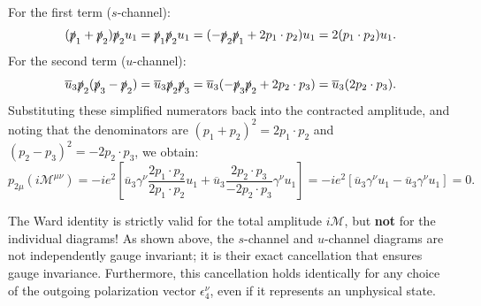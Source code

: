 For the first term ($s$-channel):
\[
    (\slashed{p}_1 + \slashed{p}_2) \slashed{p}_2 u_1 = \slashed{p}_1 \slashed{p}_2 u_1 = (-\slashed{p}_2 \slashed{p}_1 + 2p_1 \cdot p_2) u_1 = 2(p_1 \cdot p_2) u_1.
\]
For the second term ($u$-channel):
\[
    \overline{u}_3 \slashed{p}_2 (\slashed{p}_3 - \slashed{p}_2) = \overline{u}_3 \slashed{p}_2 \slashed{p}_3 = \overline{u}_3 (-\slashed{p}_3 \slashed{p}_2 + 2p_2 \cdot p_3) = \overline{u}_3 (2p_2 \cdot p_3).
\]
Substituting these simplified numerators back into the contracted amplitude, and noting that the denominators are $(p_1+p_2)^2 = 2p_1 \cdot p_2$ and $(p_2-p_3)^2 = -2p_2 \cdot p_3$, we obtain:
\[
    p_{2 \mu} (i \mathcal{M}^{\mu \nu}) = -ie^2 \left[ \overline{u}_3 \gamma^\nu \frac{2p_1 \cdot p_2}{2p_1 \cdot p_2} u_1 + \overline{u}_3 \frac{2p_2 \cdot p_3}{-2p_2 \cdot p_3} \gamma^\nu u_1 \right] = -ie^2 \left[ \overline{u}_3 \gamma^\nu u_1 - \overline{u}_3 \gamma^\nu u_1 \right] = 0.
\]

\begin{remark}
    The Ward identity is strictly valid for the total amplitude $i\mathcal{M}$, but \textbf{not} for the individual diagrams! As shown above, the $s$-channel and $u$-channel diagrams are not independently gauge invariant; it is their exact cancellation that ensures gauge invariance. Furthermore, this cancellation holds identically for any choice of the outgoing polarization vector $\epsilon_4^\nu$, even if it represents an unphysical state.
\end{remark}

